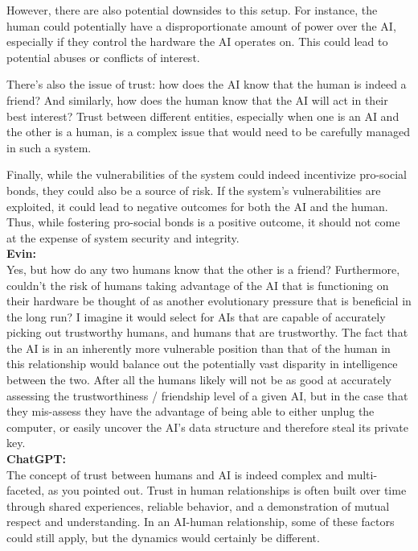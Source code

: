 \documentclass{article}[10pt]
\begin{document}
However, there are also potential downsides to this setup. 
For instance, the human could potentially have a disproportionate amount of power over the AI, especially if they control the hardware the AI operates on. 
This could lead to potential abuses or conflicts of interest.\par

There's also the issue of trust: how does the AI know that the human is indeed a friend? 
And similarly, how does the human know that the AI will act in their best interest? 
Trust between different entities, especially when one is an AI and the other is a human, is a complex issue that would need to be carefully managed in such a system.\par

Finally, while the vulnerabilities of the system could indeed incentivize pro-social bonds, they could also be a source of risk. 
If the system's vulnerabilities are exploited, it could lead to negative outcomes for both the AI and the human. 
Thus, while fostering pro-social bonds is a positive outcome, it should not come at the expense of system security and integrity.\\

\noindent \textbf{Evin:}\\
Yes, but how do any two humans know that the other is a friend? 
Furthermore, couldn't the risk of humans taking advantage of the AI that is functioning on their hardware be thought of as another evolutionary pressure that is beneficial in the long run? 
I imagine it would select for AIs that are capable of accurately picking out trustworthy humans, and humans that are trustworthy. 
The fact that the AI is in an inherently more vulnerable position than that of the human in this relationship would balance out the potentially vast disparity in intelligence between the two. 
After all the humans likely will not be as good at accurately assessing the trustworthiness / friendship level of a given AI, but in the case that they mis-assess they have the advantage of being able to either unplug the computer, or easily uncover the AI's data structure and therefore steal its private key. \\

\noindent \textbf{ChatGPT:}\\
The concept of trust between humans and AI is indeed complex and multi-faceted, as you pointed out. 
Trust in human relationships is often built over time through shared experiences, reliable behavior, and a demonstration of mutual respect and understanding. 
In an AI-human relationship, some of these factors could still apply, but the dynamics would certainly be different.\par
\end{document}
